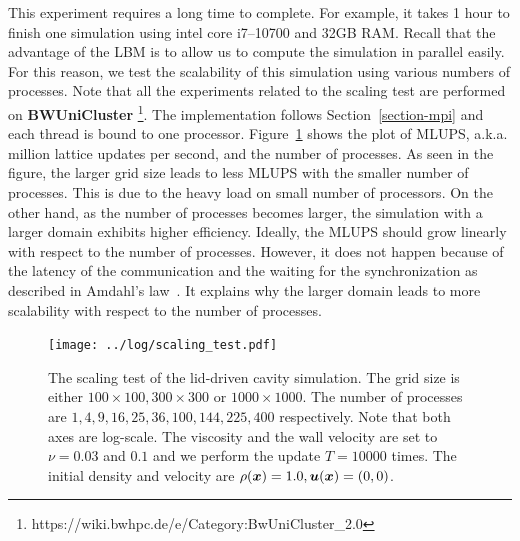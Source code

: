 This experiment requires a long time to complete.
For example, it takes 1 hour to finish one simulation using
intel core i7--10700 and 32GB RAM.
Recall that the advantage of the LBM is to allow us to compute the simulation in
parallel easily.
For this reason, we test the scalability of this simulation using
various numbers of processes.
Note that all the experiments related to the scaling test
are performed on {\bf BWUniCluster}
\footnote{https://wiki.bwhpc.de/e/Category:BwUniCluster\_2.0}.
The implementation follows Section~\ref{section-mpi}
and each thread is bound to one processor.
Figure~\ref{fig:sliding-lid-scaling} shows the plot of
MLUPS, a.k.a. million lattice updates per second, and
the number of processes.
As seen in the figure, the larger grid size leads to
less MLUPS with the smaller number of processes.
This is due to the heavy load on small number of processors.
On the other hand, as the number of processes
becomes larger, the simulation with a larger domain exhibits
higher efficiency.
Ideally, the MLUPS should grow linearly with respect to the number of processes.
However, it does not happen because of the latency of the communication
and the waiting for the synchronization as described in Amdahl's law~\cite{amdahl1967validity}.
It explains why the larger domain leads to more scalability with respect to
the number of processes.


\begin{figure}[b]
  \centering
  \texttt{[image: ../log/scaling\_test.pdf]}
  \vspace{-3mm}
  \caption{The scaling test of the lid-driven cavity simulation.
  The grid size is either $100 \times 100, 300 \times 300 \text{ or } 1000 \times 1000$.
  The number of processes are $1 ,4 ,9 ,16 ,25 ,36 ,100 ,144 ,225 ,400$ respectively.
  Note that both axes are log-scale.
    The viscosity and the wall velocity are set to $\nu = 0.03$ and $0.1$
    and we perform the update $T = 10000$ times.
    The initial density and velocity are $\rho(\boldsymbol{x}) = 1.0, \boldsymbol{u}(\boldsymbol{x}) = (0, 0)$.
  }
  \label{fig:sliding-lid-scaling}
\end{figure}
